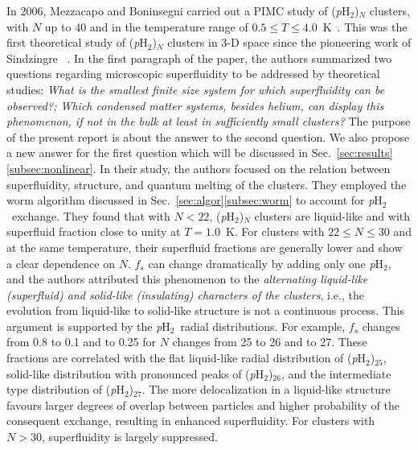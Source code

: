 \documentclass[12pt]{iopart}
\newcommand{\phtwo}{{\em p}H$_2$}
\begin{document}
In 2006, Mezzacapo and Boninsegni carried out a PIMC study of (\phtwo)$_N$ clusters, with $N$ up to $40$ and in the temperature range of $0.5 \le T \le 4.0$~K~\cite{Boninsegni_pH2_melting}. 
This was the first theoretical study of (\phtwo)$_N$ clusters in 3-D space since the pioneering work of Sindzingre \etal~\cite{sindzingre_pH2_superfluid}. 
In the first paragraph of the paper, the authors summarized two questions regarding microscopic superfluidity to be addressed by theoretical studies: {\em What is the smallest finite size system for which superfluidity can be observed?; Which condensed matter systems, besides helium, can display this phenomenon, if not in the bulk at least in sufficiently small clusters?} 
The purpose of the present report is about the answer to the second question. We also propose a new answer for the first question which will be discussed in Sec.~\ref{sec:results}\ref{subsec:nonlinear}. 
In their study, the authors focused on the relation between superfluidity, structure, and quantum melting of the clusters. 
They employed the worm algorithm discussed in Sec.~\ref{sec:algor}\ref{subsec:worm} to account for \phtwo~exchange. 
They found that with $N < 22$, (\phtwo)$_N$ clusters are liquid-like and with superfluid fraction close to unity at $T=1.0$~K. 
For clusters with $22 \le N \le 30$ and at the same temperature, their superfluid fractions are generally lower and show a clear dependence on $N$. 
$f_s$ can change dramatically by adding only one \phtwo, 
and the authors attributed this phenomenon to the {\em alternating liquid-like (superfluid) and solid-like (insulating) characters of the clusters}, i.e., the evolution from liquid-like to solid-like structure is not a continuous process. 
This argument is supported by the \phtwo~radial distributions. For example, $f_s$ changes from 0.8 to 0.1 and to 0.25 for $N$ changes from 25 to 26 and to 27. 
These fractions are correlated with the flat liquid-like radial distribution of (\phtwo)$_{25}$, solid-like distribution with pronounced peaks of (\phtwo)$_{26}$, and the intermediate type distribution of (\phtwo)$_{27}$. The more delocalization in a liquid-like structure favours  larger degrees of overlap between particles and higher probability of the consequent exchange, resulting in enhanced superfluidity. 
For clusters with $N > 30$, superfluidity is largely suppressed.
\end{document}
